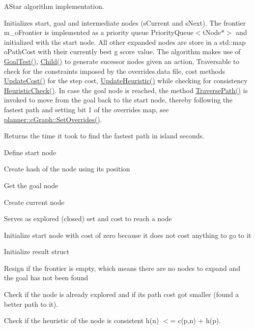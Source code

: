 A\+Star algorithm implementation. 

Initializes start, goal and intermediate nodes (s\+Current and s\+Next). The frontier m\+\_\+o\+Frontier is implemented as a priority queue Priority\+Queue$<$t\+Node$\ast$$>$ and initialized with the start node. All other expanded nodes are store in a std\+::map o\+Path\+Cost with their currently best g score value. The algorithm makes use of \mbox{\hyperlink{classplanner_1_1c_planner_a6b7554394efd7ad10d76a49b370aa62f}{Goal\+Test()}}, \mbox{\hyperlink{classplanner_1_1c_planner_adbffc6ce05119c940a09369d7e61554e}{Child()}} to generate sucessor nodes given an action, Traversable to check for the constraints imposed by the overrides.\+data file, cost methods \mbox{\hyperlink{classplanner_1_1c_planner_a16e8c156297fff49a6ba9b97073baffb}{Update\+Cost()}} for the step cost, \mbox{\hyperlink{classplanner_1_1c_planner_ab7cc7c2666de2e49f745901080aac147}{Update\+Heuristic()}} while checking for consistency \mbox{\hyperlink{classplanner_1_1c_planner_a1234d075676fcaa2c17b859d11b4638c}{Heuristic\+Check()}}. In case the goal node is reached, the method \mbox{\hyperlink{classplanner_1_1c_planner_a8624cb2afb8f2fd216c38b4424013178}{Traverse\+Path()}} is invoked to move from the goal back to the start node, thereby following the fastest path and setting bit 1 of the overrides map, see \mbox{\hyperlink{classplanner_1_1c_graph_a6da6e6e269013628aef48245a7787cb9}{planner\+::c\+Graph\+::\+Set\+Overrides()}}. \begin{DoxyReturn}{Returns}
the time it took to find the fastest path in island seconds. 
\end{DoxyReturn}
Define start node

Create hash of the node using its position

Get the goal node

Create current node

Serves as explored (closed) set and cost to reach a node

Initialize start node with cost of zero because it does not cost anything to go to it

Initialize result struct

Resign if the frontier is empty, which means there are no nodes to expand and the goal has not been found

Check if the node is already explored and if its path cost got smaller (found a better path to it).

Check if the heuristic of the node is consistent h(n) $<$= c(p,n) + h(p).


